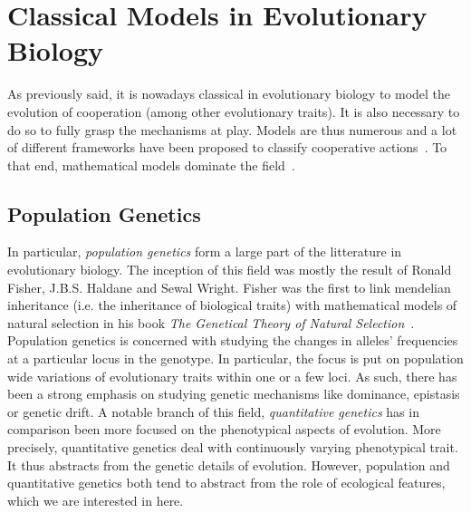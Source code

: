 

\section{Classical Models in Evolutionary Biology}

    As previously said, it is nowadays classical in evolutionary biology to model the evolution of cooperation (among other evolutionary traits). It is also necessary to do so to fully grasp the mechanisms at play.  Models are thus numerous and a lot of different frameworks have been proposed to classify cooperative actions~\parencite{Dugatkin2002, Sachs2004, Lehmann2006}. To that end, mathematical models dominate the field~\parencite{Servedio2014}. 

    \subsection{Population Genetics}

        In particular, \emph{population genetics} form a large part of the litterature in evolutionary biology. The inception of this field was mostly the result of Ronald Fisher, J.B.S. Haldane and Sewal Wright. Fisher was the first to link mendelian inheritance (i.e. the inheritance of biological traits) with mathematical models of natural selection in his book \textit{The Genetical Theory of Natural Selection}~\parencite{Fisher1930}. Population genetics is concerned with studying the changes in alleles' frequencies at a particular locus in the genotype. In particular, the focus is put on population wide variations of evolutionary traits within one or a few loci. As such, there has been a strong emphasis on studying genetic mechanisms like dominance, epistasis or genetic drift. A notable branch of this field, \emph{quantitative genetics} has in comparison been more focused on the phenotypical aspects of evolution. More precisely, quantitative genetics deal with continuously varying phenotypical trait. It thus abstracts from the genetic details of evolution. However, population and quantitative genetics both tend to abstract from the role of ecological features, which we are interested in here. 



